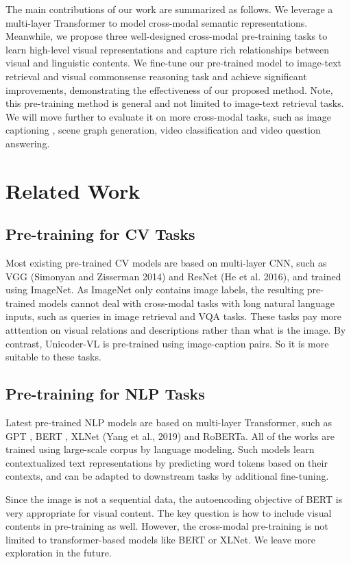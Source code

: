 \documentclass[letterpaper]{article} \usepackage{aaai20}  \usepackage{times}  \usepackage{helvet} \usepackage{courier}  \usepackage[hyphens]{url}  \usepackage{graphicx} \urlstyle{rm} \def\UrlFont{\rm}  \usepackage{graphicx}  \frenchspacing  \setlength{\pdfpagewidth}{8.5in}  \setlength{\pdfpageheight}{11in}  \usepackage{amssymb}
\begin{document}
The main contributions of our work are summarized as follows. We leverage a multi-layer Transformer to model cross-modal semantic representations. Meanwhile, we propose three well-designed cross-modal pre-training tasks to learn high-level visual representations and capture rich relationships between visual and linguistic contents. We fine-tune our pre-trained model to image-text retrieval and visual commonsense reasoning task and achieve significant improvements, demonstrating the effectiveness of our proposed method. 
Note, this pre-training method is general and not limited to image-text retrieval tasks. We will move further to evaluate it on more cross-modal tasks, such as image captioning \cite{anderson2018bottom}, scene graph generation, video classification and video question answering.

\section{Related Work}

\subsection{Pre-training for CV Tasks}
Most existing pre-trained CV models are based on multi-layer CNN, such as VGG (Simonyan and
Zisserman 2014) and ResNet (He et al. 2016), and trained using ImageNet. As ImageNet \cite{deng2009imagenet} only contains image labels, the resulting pre-trained models cannot deal with cross-modal tasks with long natural language inputs, such as queries in image retrieval and VQA tasks. These tasks pay more atttention on visual relations and descriptions rather than what is the image.
By contrast, Unicoder-VL is pre-trained using image-caption pairs. So it is more suitable to these tasks. 
\subsection{Pre-training for NLP Tasks}
Latest pre-trained NLP models are based on multi-layer Transformer, such as GPT \cite{radford2018improving}, BERT \cite{devlin2018bert}, XLNet (Yang et al., 2019) and RoBERTa\cite{liu2019roberta}. All of the works are trained using large-scale corpus by language modeling. Such models learn contextualized text representations by predicting word tokens based on their contexts, and can be adapted to downstream tasks by additional fine-tuning. 

Since the image is not a sequential data, the autoencoding objective of BERT is very appropriate for visual content. The key question is how to include visual contents in pre-training as well. However, the cross-modal pre-training is not limited to transformer-based models like BERT or XLNet. We leave more exploration in the future.
\end{document}
